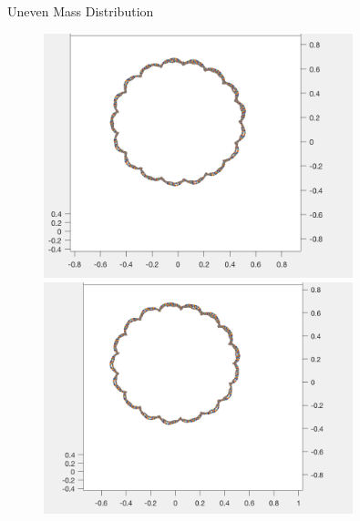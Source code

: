 \documentclass[10pt]{beamer}
\begin{document}
\begin{frame} {Uneven Mass Distribution}
    \begin{figure}
	\begin{minipage}{0.48\textwidth}
		\centering
		\includegraphics[width=0.8\textwidth]{trace_first5.png}
	\end{minipage}
	\begin{minipage}{0.48\textwidth}
		\centering
		\includegraphics[width=0.8\textwidth]{trace_second5.png}
	\end{minipage}
    \end{figure}
\end{frame}
\end{document}
